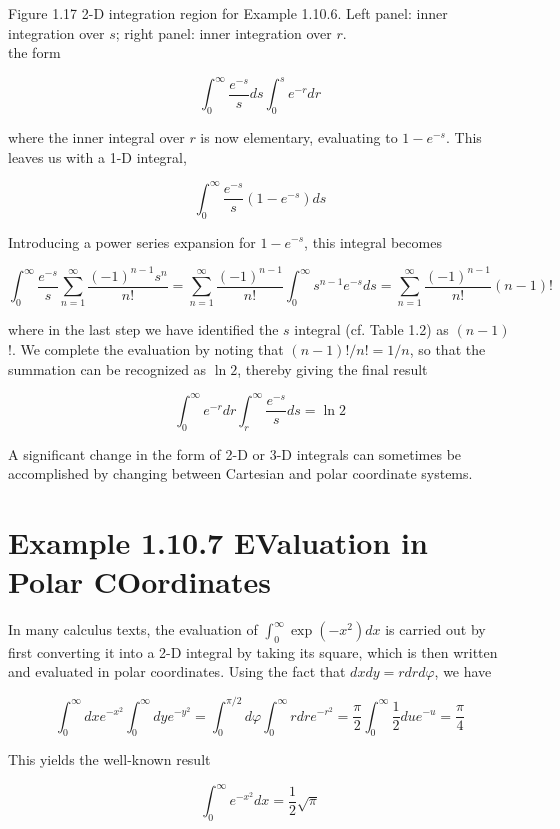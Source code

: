 \documentclass[10pt]{article}
\begin{document}
Figure 1.17 2-D integration region for Example 1.10.6. Left panel: inner integration over $s$; right panel: inner integration over $r$.\\
the form

$$
\int_{0}^{\infty} \frac{e^{-s}}{s} d s \int_{0}^{s} e^{-r} d r
$$

where the inner integral over $r$ is now elementary, evaluating to $1-e^{-s}$. This leaves us with a 1-D integral,

$$
\int_{0}^{\infty} \frac{e^{-s}}{s}\left(1-e^{-s}\right) d s
$$

Introducing a power series expansion for $1-e^{-s}$, this integral becomes

$$
\int_{0}^{\infty} \frac{e^{-s}}{s} \sum_{n=1}^{\infty} \frac{(-1)^{n-1} s^{n}}{n!}=\sum_{n=1}^{\infty} \frac{(-1)^{n-1}}{n!} \int_{0}^{\infty} s^{n-1} e^{-s} d s=\sum_{n=1}^{\infty} \frac{(-1)^{n-1}}{n!}(n-1)!
$$

where in the last step we have identified the $s$ integral (cf. Table 1.2) as $(n-1)$ !. We complete the evaluation by noting that $(n-1)!/ n!=1 / n$, so that the summation can be recognized as $\ln 2$, thereby giving the final result

$$
\int_{0}^{\infty} e^{-r} d r \int_{r}^{\infty} \frac{e^{-s}}{s} d s=\ln 2
$$

A significant change in the form of 2-D or 3-D integrals can sometimes be accomplished by changing between Cartesian and polar coordinate systems.

\section*{Example 1.10.7 EValuation in Polar COordinates}
In many calculus texts, the evaluation of $\int_{0}^{\infty} \exp \left(-x^{2}\right) d x$ is carried out by first converting it into a 2-D integral by taking its square, which is then written and evaluated in polar coordinates. Using the fact that $d x d y=r d r d \varphi$, we have

$$
\int_{0}^{\infty} d x e^{-x^{2}} \int_{0}^{\infty} d y e^{-y^{2}}=\int_{0}^{\pi / 2} d \varphi \int_{0}^{\infty} r d r e^{-r^{2}}=\frac{\pi}{2} \int_{0}^{\infty} \frac{1}{2} d u e^{-u}=\frac{\pi}{4}
$$

This yields the well-known result


\begin{equation*}
\int_{0}^{\infty} e^{-x^{2}} d x=\frac{1}{2} \sqrt{\pi} \tag{1.148}
\end{equation*}
\end{document}
